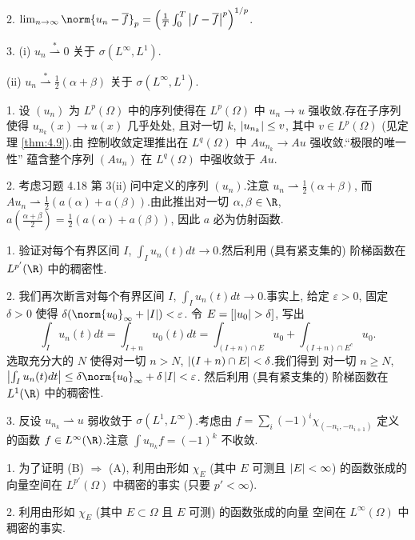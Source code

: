 2. $\lim_{n\to\infty}\norm{u_n-\overline f}_p=\left(\frac1T\int_0^T\abs{f-\overline f}^p\right)^{1/p}$.

3. (i) $u_n\overset{*}{\rightharpoonup}0$ 关于 $\sigma(L^\infty,L^1)$.

(ii) $u_n\overset{*}{\rightharpoonup}\frac12(\alpha+\beta)$ 关于 $\sigma(L^\infty,L^1)$.


1. 设 $(u_n)$ 为 $L^p(\Omega)$ 中的序列使得在 $L^p(\Omega)$ 中 $u_n\to u$
强收敛.存在子序列使得 $u_{n_k}(x)\to u(x)$ 几乎处处, 且对一切 $k$,
$\left|u_{n_k}\right|\le v$, 其中 $v\in L^p(\Omega)$ (见定理  \ref{thm:4.9}).由
控制收敛定理推出在 $L^q(\Omega)$ 中 $Au_{n_k}\to Au$ 强收敛.``极限的唯一性''
蕴含整个序列 $(Au_n)$ 在 $L^q(\Omega)$ 中强收敛于 $Au$.

2. 考虑习题 4.18 第 3(ii) 问中定义的序列 $(u_n)$.注意 $u_n\rightharpoonup\frac12(\alpha+\beta)$,
而 $Au_n\rightharpoonup\frac12(a(\alpha)+a(\beta))$.由此推出对一切 $\alpha,\beta\in\R$,
$a\left(\frac{\alpha+\beta}{2}\right)=\frac12(a(\alpha)+a(\beta))$, 因此 $a$
必为仿射函数.


1. 验证对每个有界区间 $I$, $\int_I u_n(t)dt\to0$.然后利用 (具有紧支集的)
阶梯函数在 $L^{p'}(\R)$ 中的稠密性.

2. 我们再次断言对每个有界区间 $I$, $\int_I u_n(t)dt\to0$.事实上, 给定
$\varepsilon>0$, 固定 $\delta>0$ 使得 $\delta(\norm{u_0}_\infty+\abs{I})<\varepsilon$.
令 $E=[\abs{u_0}>\delta]$, 写出
\begin{equation*}
\int_I u_n(t)dt=\int_{I+n}u_0(t)dt=\int_{(I+n)\cap E}u_0+\int_{(I+n)\cap E^c}u_0.
\end{equation*}
选取充分大的 $N$ 使得对一切 $n>N$, $\left|(I+n)\cap E\right|<\delta$.我们得到
对一切 $n\ge N$, $\abs{\int_I u_n(t)dt}\le\delta\norm{u_0}_\infty+\delta\abs{I}<\varepsilon$.
然后利用 (具有紧支集的) 阶梯函数在 $L^1(\R)$ 中的稠密性.

3. 反设 $u_{n_k}\rightharpoonup u$ 弱收敛于 $\sigma(L^1,L^\infty)$.考虑由
$f=\sum_i(-1)^i\chi_{(-n_i,-n_{i+1})}$ 定义的函数 $f\in L^\infty(\R)$.注意
$\int u_{n_k}f=(-1)^k$ 不收敛.


1. 为了证明 (B) $\Rightarrow$ (A), 利用由形如 $\chi_E$ (其中 $E$ 可测且
$\left|E\right|<\infty$) 的函数张成的向量空间在 $L^{p'}(\Omega)$ 中稠密的事实
(只要 $p'<\infty$).

2. 利用由形如 $\chi_E$ (其中 $E\subset\Omega$ 且 $E$ 可测) 的函数张成的向量
空间在 $L^\infty(\Omega)$ 中稠密的事实.

